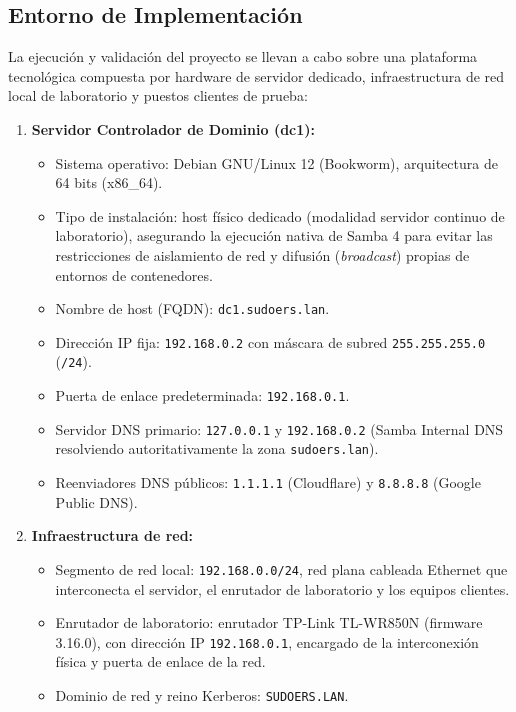 \subsection{Entorno de Implementación}

La ejecución y validación del proyecto se llevan a cabo sobre una plataforma tecnológica compuesta por hardware de servidor dedicado, infraestructura de red local de laboratorio y puestos clientes de prueba:

\begin{enumerate}[label=\alph*)]
    \item \textbf{Servidor Controlador de Dominio (dc1):}
    \begin{itemize}
        \item Sistema operativo: Debian GNU/Linux 12 (Bookworm), arquitectura de 64 bits (x86\_64).
        \item Tipo de instalación: host físico dedicado (modalidad servidor continuo de laboratorio), asegurando la ejecución nativa de Samba 4 para evitar las restricciones de aislamiento de red y difusión (\textit{broadcast}) propias de entornos de contenedores.
        \item Nombre de host (FQDN): \texttt{dc1.sudoers.lan}.
        \item Dirección IP fija: \texttt{192.168.0.2} con máscara de subred \texttt{255.255.255.0} (\texttt{/24}).
        \item Puerta de enlace predeterminada: \texttt{192.168.0.1}.
        \item Servidor DNS primario: \texttt{127.0.0.1} y \texttt{192.168.0.2} (Samba Internal DNS resolviendo autoritativamente la zona \texttt{sudoers.lan}).
        \item Reenviadores DNS públicos: \texttt{1.1.1.1} (Cloudflare) y \texttt{8.8.8.8} (Google Public DNS).
    \end{itemize}

    \item \textbf{Infraestructura de red:}
    \begin{itemize}
        \item Segmento de red local: \texttt{192.168.0.0/24}, red plana cableada Ethernet que interconecta el servidor, el enrutador de laboratorio y los equipos clientes.
        \item Enrutador de laboratorio: enrutador TP-Link TL-WR850N (firmware 3.16.0), con dirección IP \texttt{192.168.0.1}, encargado de la interconexión física y puerta de enlace de la red.
        \item Dominio de red y reino Kerberos: \texttt{SUDOERS.LAN}.
    \end{itemize}


\end{enumerate}
